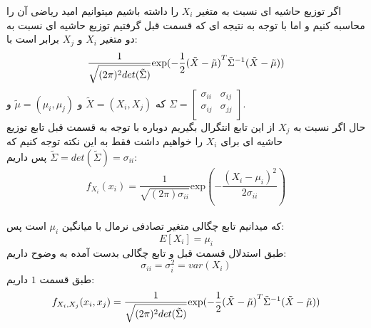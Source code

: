 \parte{}
اگر توزیع حاشیه ای نسبت به متغیر $X_i$  را داشته باشیم میتوانیم امید ریاضی آن را محاسبه کنیم و اما با توجه به نتیجه ای که قسمت قبل گرفتیم
توزیع حاشیه ای نسبت به دو متغیر $X_i$ و $X_j$ برابر است با:\\
\[ 
    \frac{1}{\sqrt{(2\pi)^2 det(\tilde{\Sigma})}} \text{exp}(-\frac{1}{2}{(\tilde{X} - \tilde{\mu})}^{T}\Tilde{\Sigma}^{-1}(\tilde{X} - \tilde{\mu}))
\]
که $\tilde{X} = (X_i,X_j)$ و $\tilde{\mu} = (\mu_i,\mu_j)$ و $\Sigma = 
\begin{bmatrix}
    \sigma_{ii} & \sigma_{ij} \\
    \sigma_{ij} & \sigma_{jj} \\
\end{bmatrix}
$.\\
حال اگر نسبت به $X_j$ از این تابع انتگرال بگیریم دوباره با توجه به قسمت قبل تابع توزیع حاشیه ای برای $X_i$ را خواهیم داشت
فقط به این نکته توجه کنیم که $\tilde{\Sigma} = det(\tilde{\Sigma}) = \sigma_{ii}$ پس داریم:\\
\[ 
    f_{X_i}(x_i) =  \frac{1}{\sqrt{(2\pi)\sigma_{ii}}} \text{exp}(-\frac{(X_i - \mu_i)^2}{2\sigma_{ii}})
\]
\\
 که میدانیم تابع چگالی متغیر تصادفی نرمال با میانگین $\mu_i$ است پس:
 \[ E[X_i] = \mu_i\]
\parte{}
طبق استدلال قسمت قبل و تابع چگالی بدست آمده به وضوح داریم:\\
\[\sigma_{ii} = \sigma_{i}^2 = var(X_i) \]
\parte{}
طبق قسمت $1$ داریم:\\
\[
    f_{X_i,X_j}(x_i,x_j)=\frac{1}{\sqrt{(2\pi)^2 det(\tilde{\Sigma})}} \text{exp}(-\frac{1}{2}{(\tilde{X} - \tilde{\mu})}^{T}\Tilde{\Sigma}^{-1}(\tilde{X} - \tilde{\mu}))
\]